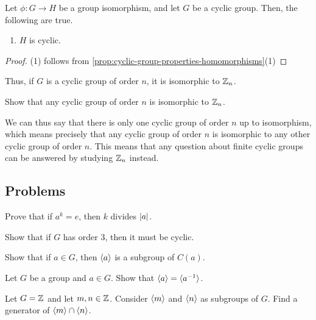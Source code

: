 \documentclass[./main.tex]{subfiles}
\begin{document}
\begin{proposition}
    Let $\phi: G \to H$ be a group isomorphism, and let $G$ be a cyclic group.
    Then, the following are true.
    \begin{enumerate}
        \item $H$ is cyclic. 
    \end{enumerate}
\end{proposition}
\begin{proof}
    (1) follows from \cref{prop:cyclic-group-properties-homomorphisms}(1)
\end{proof}
Thus, if $G$ is a cyclic group of order $n$, it is isomorphic to $\mathbb{Z}_n$.
\begin{exercise}
    Show that any cyclic group of order $n$ is isomorphic to $\mathbb{Z}_n$.
\end{exercise}
We can thus say that there is only one cyclic group of order $n$ up to
isomorphism, which means precisely that any cyclic group of order $n$ is
isomorphic to any other cyclic group of order $n$. This means that any question
about finite cyclic groups can be answered by studying $\mathbb{Z}_n$ instead.

\subsection{Problems}

\begin{exercise}
    Prove that if $a^k = e$, then $k$ divides $\abs{a}$.
\end{exercise}

\begin{exercise}
    Show that if $G$ has order 3, then it must be cyclic.
\end{exercise}

\begin{exercise}
    Show that if $a \in G$, then ${ \langle a \rangle }$ is a subgroup of $C(a)$.
\end{exercise}

\begin{exercise}
    Let $G$ be a group and $a \in G$. Show that ${ \langle a \rangle } = { \langle a^{-1} \rangle }$.
\end{exercise}

\begin{exercise}
    Let $G = \mathbb{Z}$ and let $m, n \in \mathbb{Z}$. Consider ${ \langle m \rangle }$ and ${ \langle n \rangle }$ as
    subgroups of $G$. Find a generator of ${ \langle m \rangle } \cap { \langle n \rangle }$.
\end{exercise}
\end{document}
